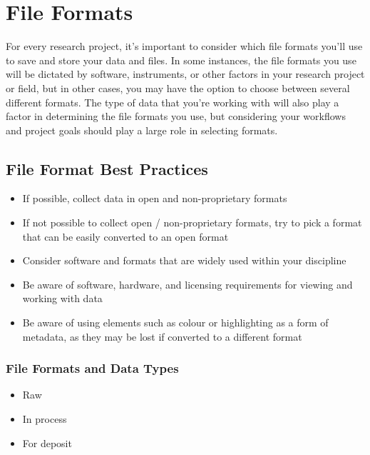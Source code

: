 \documentclass[
]{book}
\providecommand{\tightlist}{%
  \setlength{\itemsep}{0pt}\setlength{\parskip}{0pt}}
\begin{document}
\hypertarget{file-formats-1}{%
\chapter*{File Formats}\label{file-formats-1}}

For every research project, it's important to consider which file formats you'll use to save and store your data and files. In some instances, the file formats you use will be dictated by software, instruments, or other factors in your research project or field, but in other cases, you may have the option to choose between several different formats. The type of data that you're working with will also play a factor in determining the file formats you use, but considering your workflows and project goals should play a large role in selecting formats.

\hypertarget{file-format-best-practices}{%
\section*{File Format Best Practices}\label{file-format-best-practices}}

\begin{itemize}
\tightlist
\item
  If possible, collect data in open and non-proprietary formats
\item
  If not possible to collect open / non-proprietary formats, try to pick a format that can be easily converted to an open format
\item
  Consider software and formats that are widely used within your discipline
\item
  Be aware of software, hardware, and licensing requirements for viewing and working with data
\item
  Be aware of using elements such as colour or highlighting as a form of metadata, as they may be lost if converted to a different format
\end{itemize}

\hypertarget{file-formats-and-data-types}{%
\subsection*{File Formats and Data Types}\label{file-formats-and-data-types}}

\begin{itemize}
\tightlist
\item
  Raw
\item
  In process
\item
  For deposit
\end{itemize}
\end{document}
